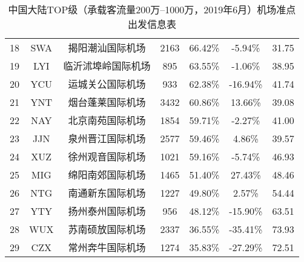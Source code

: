 \begin{table}
{\begin{tabular}{ccccccc}
            18 & SWA & 揭阳潮汕国际机场 & 2163 & 66.42\% & -5.94\% & 31.75 \\
            \rowcolor[HTML]{EFEFEF}
            19 & LYI & 临沂沭埠岭国际机场 & 895 & 63.55\% & -1.06\% & 38.95 \\
            20 & YCU & 运城关公国际机场 & 933 & 62.38\% & -16.94\% & 41.74 \\
            \rowcolor[HTML]{EFEFEF}
            21 & YNT & 烟台蓬莱国际机场 & 3432 & 60.86\% & 13.66\% & 39.08 \\
            22 & NAY & 北京南苑国际机场 & 1854 & 59.71\% & -2.27\% & 41.00 \\
            \rowcolor[HTML]{EFEFEF}
            23 & JJN & 泉州晋江国际机场 & 2577 & 59.46\% & 4.86\% & 39.57 \\
            24 & XUZ & 徐州观音国际机场 & 1021 & 59.16\% & -5.74\% & 46.93 \\
            \rowcolor[HTML]{EFEFEF}
            25 & MIG & 绵阳南郊国际机场 & 1465 & 51.40\% & 27.43\% & 48.46 \\
            26 & NTG & 南通新东国际机场 & 1227 & 49.80\% & 2.57\% & 54.44 \\
            \rowcolor[HTML]{EFEFEF}
            27 & YTY & 扬州泰州国际机场 & 956 & 48.12\% & -15.90\% & 63.51 \\
            28 & WUX & 苏南硕放国际机场 & 2337 & 36.55\% & -35.41\% & 73.93 \\
            \rowcolor[HTML]{EFEFEF}
            29 & CZX & 常州奔牛国际机场 & 1274 & 35.83\% & -27.29\% & 72.51 \\ \hline
        \end{tabular}%
    }
    \caption{中国大陆TOP级（承载客流量200万--1000万，2019年6月）机场准点出发信息表}\label{T:depart_3_3}
\end{table}
